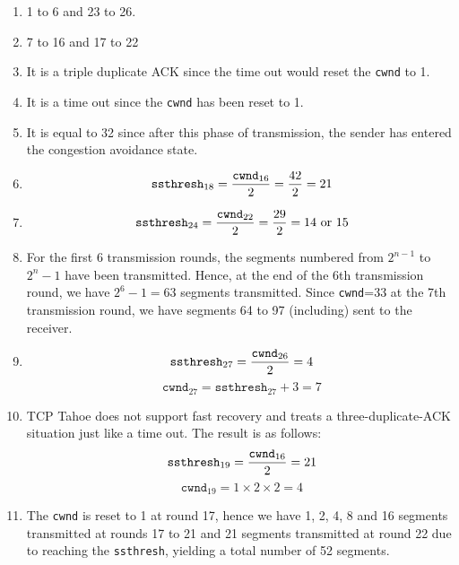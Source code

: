 \documentclass[10pt,letterpaper]{article}
\begin{document}
\begin{enumerate}[label=\alph*-]
\item
1 to 6 and 23 to 26.
\item
7 to 16 and 17 to 22
\item
It is a triple duplicate ACK since the time out would reset the \texttt{cwnd} to 1.
\item
It is a time out since the \texttt{cwnd} has been reset to 1.
\item
It is equal to 32 since after this phase of transmission, the sender has entered the congestion avoidance state.
\item
$$
\texttt{ssthresh}_{18}={\texttt{cwnd}_{16}\over 2}={42\over 2}=21
$$
\item
$$
\texttt{ssthresh}_{24}={\texttt{cwnd}_{22}\over 2}={29\over 2}=14 \text{ or }15
$$
\item
For the first 6 transmission rounds, the segments numbered from $2^{n-1}$ to $2^n-1$ have been transmitted. Hence, at the end of the 6th transmission round, we have $2^6-1=63$ segments transmitted. Since \texttt{cwnd}=33 at the 7th transmission round, we have segments 64 to 97 (including) sent to the receiver.
\item
$$
\texttt{ssthresh}_{27}={\texttt{cwnd}_{26}\over2}=4
$$
$$
\texttt{cwnd}_{27}=\texttt{ssthresh}_{27}+3=7
$$
\item
TCP Tahoe does not support fast recovery and treats a three-duplicate-ACK situation just like a time out. The result is as follows:
$$
\texttt{ssthresh}_{19}={\texttt{cwnd}_{16}\over2}=21
$$
$$
\texttt{cwnd}_{19}=1\times 2\times 2=4
$$
\item
The \texttt{cwnd} is reset to 1 at round 17, hence we have 1, 2, 4, 8 and 16 segments transmitted at rounds 17 to 21 and 21 segments transmitted at round 22 due to reaching the \texttt{ssthresh}, yielding a total number of 52 segments.
\end{enumerate}

%
\end{document}
